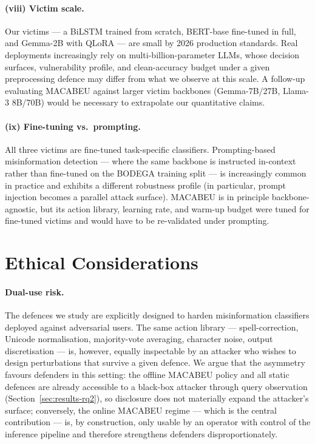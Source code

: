 \documentclass[11pt]{article}
\begin{document}
\paragraph{(viii) Victim scale.} Our victims --- a BiLSTM trained from scratch, BERT-base fine-tuned in full, and Gemma-2B with QLoRA --- are small by 2026 production standards. Real deployments increasingly rely on multi-billion-parameter LLMs, whose decision surfaces, vulnerability profile, and clean-accuracy budget under a given preprocessing defence may differ from what we observe at this scale. A follow-up evaluating MACABEU against larger victim backbones (Gemma-7B/27B, Llama-3 8B/70B) would be necessary to extrapolate our quantitative claims.

\paragraph{(ix) Fine-tuning vs.\ prompting.} All three victims are fine-tuned task-specific classifiers. Prompting-based misinformation detection --- where the same backbone is instructed in-context rather than fine-tuned on the BODEGA training split --- is increasingly common in practice and exhibits a different robustness profile (in particular, prompt injection becomes a parallel attack surface). MACABEU is in principle backbone-agnostic, but its action library, learning rate, and warm-up budget were tuned for fine-tuned victims and would have to be re-validated under prompting.

\section*{Ethical Considerations}

\paragraph{Dual-use risk.} The defences we study are explicitly designed to harden misinformation classifiers deployed against adversarial users. The same action library --- spell-correction, Unicode normalisation, majority-vote averaging, character noise, output discretisation --- is, however, equally inspectable by an attacker who wishes to design perturbations that survive a given defence. We argue that the asymmetry favours defenders in this setting: the offline MACABEU policy and all static defences are already accessible to a black-box attacker through query observation (Section~\ref{sec:results-rq2}), so disclosure does not materially expand the attacker's surface; conversely, the online MACABEU regime --- which is the central contribution --- is, by construction, only usable by an operator with control of the inference pipeline and therefore strengthens defenders disproportionately.
\end{document}
